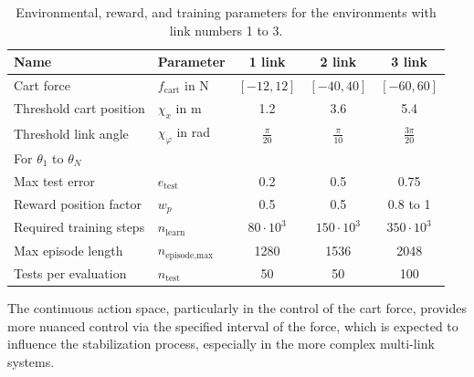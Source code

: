 \begin{table}[h]
	\centering
	\caption{Environmental, reward, and training parameters for the environments with link numbers 1 to 3.}
	\label{tab:env_params}
	\begin{tabular}{l l c c c}
		\toprule
		\textbf{Name} & \textbf{Parameter} & \textbf{1 link} & \textbf{2 link} & \textbf{3 link} \\ \midrule
		Cart force              & $f_{\text{cart}}$ in N         & \([-12, 12]\)   & \([-40, 40]\)   & \([-60, 60]\)  \\ 
		Threshold cart position & $\chi_x$ in m                 & 1.2  & 3.6  & 5.4 \\ 
		Threshold link angle    & $\chi_\varphi$ in rad         & $\frac{\pi}{20}$ & $\frac{\pi}{10}$ & $\frac{3\pi}{20}$ \\
		For $\theta_1$ to $\theta_N$ & & & & \\
		Max test error          & $e_{\text{test}}$             & 0.2  & 0.5  & 0.75 \\ 
		Reward position factor  & $w_p$                         & 0.5  & 0.5  & 0.8 to 1 \\ 
		Required training steps & $n_{\text{learn}}$            & $80 \cdot 10^3$ & $150 \cdot 10^3$ & $350 \cdot 10^3$ \\ 
		Max episode length      & $n_{\text{episode,max}}$      & 1280 & 1536 & 2048 \\ 
		Tests per evaluation    & $n_{\text{test}}$             & 50   & 50   & 100 \\ 
		\bottomrule
	\end{tabular}
\end{table}

The continuous action space, particularly in the control of the cart force, provides more nuanced control via the specified interval of the force, which is expected to influence the stabilization process, especially in the more complex multi-link systems.


